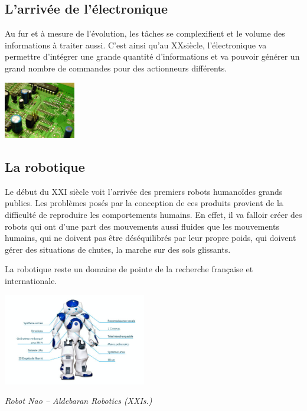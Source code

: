 \documentclass[10pt,fleqn]{article} %
\begin{document}
\subsection{L'arrivée de l'électronique}
\begin{minipage}[c]{0.7\textwidth}
Au fur et à mesure de l'évolution, les tâches se complexifient et le volume des informations à traiter aussi. C'est ainsi qu'au XX\ieme siècle, l'électronique va permettre d'intégrer une grande quantité d'informations et va pouvoir générer un grand nombre de commandes pour des actionneurs différents.
\end{minipage}\hfill
\begin{minipage}[c]{0.2\textwidth}
 \begin{center}
 \includegraphics[height=2.5cm]{images/electro_p}
 \end{center}
\end{minipage}

\subsection{La robotique}
\begin{minipage}[c]{0.5\textwidth}
Le début du XXI \ieme siècle voit l'arrivée des premiers robots humanoïdes grands publics. Les problèmes posés par la conception de ces produits provient de la difficulté de reproduire les comportements humains. En effet, il va falloir créer des robots qui ont d'une part des mouvements aussi fluides que les mouvements humains, qui ne doivent pas être déséquilibrés par leur propre poids, qui doivent gérer des situations de chutes, la marche sur des sols glissants.

La robotique reste un domaine de pointe de la recherche française et internationale.
\end{minipage}\hfill
\begin{minipage}[c]{0.4\textwidth}
 \begin{center}
 \includegraphics[height=4cm]{images/nao2}

\textit{Robot Nao -- Aldebaran Robotics (XXI\ieme s.)}
 \end{center}
\end{minipage}
\end{document}
